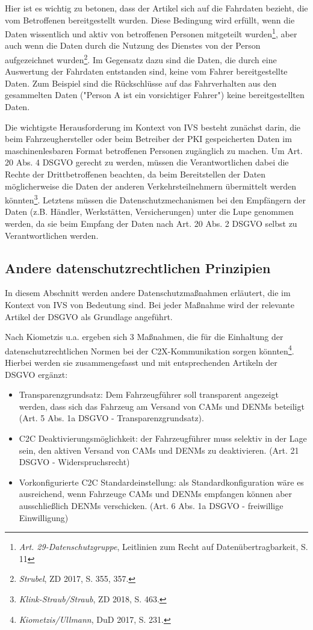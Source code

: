 Hier ist es wichtig zu betonen, dass der Artikel sich auf die Fahrdaten bezieht, die vom Betroffenen bereitgestellt wurden. Diese Bedingung wird erfüllt, wenn die Daten wissentlich und aktiv von betroffenen Personen mitgeteilt wurden\footnote{\emph{Art. 29-Datenschutzgruppe}, Leitlinien zum Recht auf Datenübertragbarkeit, S. 11}, aber auch wenn die Daten durch die Nutzung des Dienstes von der Person aufgezeichnet wurden\footnote{\emph{Strubel}, ZD 2017, S. 355, 357.}\nocite{Strubel2017}. Im Gegensatz dazu sind die Daten, die durch eine Auswertung der Fahrdaten entstanden sind, keine vom Fahrer bereitgestellte Daten. Zum Beispiel sind die Rückschlüsse auf das Fahrverhalten aus den gesammelten Daten ("Person A ist ein vorsichtiger Fahrer") keine bereitgestellten Daten. 

Die wichtigste Herausforderung im Kontext von IVS besteht zunächst darin, die beim Fahrzeughersteller oder beim Betreiber der PKI gespeicherten Daten im maschinenlesbaren Format betroffenen Personen zugänglich zu machen. Um Art. 20 Abs. 4 DSGVO gerecht zu werden, müssen die Verantwortlichen dabei die Rechte der Drittbetroffenen beachten, da beim Bereitstellen der Daten möglicherweise die Daten der anderen Verkehrsteilnehmern übermittelt werden könnten\footnote{\emph{Klink-Straub/Straub}, ZD 2018, S. 463.}. Letztens müssen die Datenschutzmechanismen bei den Empfängern der Daten (z.B. Händler, Werkstätten, Versicherungen) unter die Lupe genommen werden, da sie beim Empfang der Daten nach Art. 20 Abs. 2 DSGVO selbst zu Verantwortlichen werden.

\subsection{Andere datenschutzrechtlichen Prinzipien}

In diesem Abschnitt werden andere Datenschutzmaßnahmen erläutert, die im Kontext von IVS von Bedeutung sind. Bei jeder Maßnahme wird der relevante Artikel der DSGVO als Grundlage angeführt.

Nach Kiometzis u.a. \nocite{Kiometzis2017}ergeben sich 3 Maßnahmen, die für die Einhaltung der datenschutzrechtlichen Normen bei der C2X-Kommunikation sorgen könnten\footnote{\emph{Kiometzis/Ullmann}, DuD 2017, S. 231.}. Hierbei werden sie zusammengefasst und mit entsprechenden Artikeln der DSGVO ergänzt:
\begin{itemize}
	\item Transparenzgrundsatz: Dem Fahrzeugführer soll transparent angezeigt werden, dass sich das Fahrzeug am Versand von CAMs und DENMs beteiligt (Art. 5 Abs. 1a DSGVO - Transparenzgrundsatz). 
	\item C2C Deaktivierungsmöglichkeit: der Fahrzeugführer muss selektiv in der Lage sein, den aktiven Versand von CAMs und DENMs zu deaktivieren. (Art. 21 DSGVO - Widerspruchsrecht)
	\item Vorkonfigurierte C2C Standardeinstellung: als Standardkonfiguration wäre es ausreichend, wenn Fahrzeuge CAMs und DENMs empfangen können aber ausschließlich DENMs verschicken. (Art. 6 Abs. 1a DSGVO - freiwillige Einwilligung)
\end{itemize}

